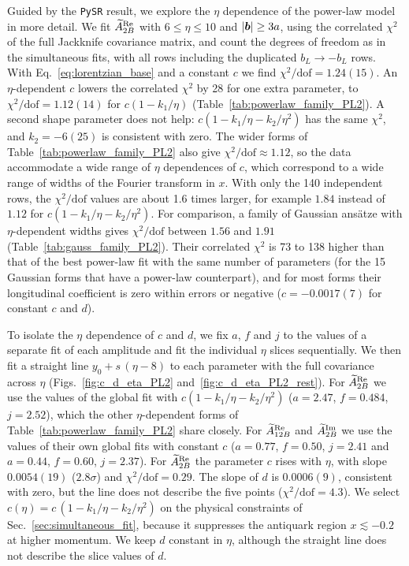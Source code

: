 Guided by the \texttt{PySR} result, we explore the $\eta$ dependence of the power-law model in more detail. We fit $\widetilde{A}_{2B}^{\text{Re}}$ with $6\le\eta\le10$ and $|\boldsymbol{b}|\ge3a$, using the correlated $\chi^2$ of the full Jackknife covariance matrix, and count the degrees of freedom as in the simultaneous fits, with all rows including the duplicated $b_L\to-b_L$ rows. With Eq.~\eqref{eq:lorentzian_base} and a constant $c$ we find $\chi^2/\text{dof}=1.24(15)$. An $\eta$-dependent $c$ lowers the correlated $\chi^2$ by 28 for one extra parameter, to $\chi^2/\text{dof}=1.12(14)$ for $c(1-k_1/\eta)$ (Table~\ref{tab:powerlaw_family_PL2}). A second shape parameter does not help: $c(1-k_1/\eta-k_2/\eta^2)$ has the same $\chi^2$, and $k_2=-6(25)$ is consistent with zero. The wider forms of Table~\ref{tab:powerlaw_family_PL2} also give $\chi^2/\text{dof}\approx1.12$, so the data accommodate a wide range of $\eta$ dependences of $c$, which correspond to a wide range of widths of the Fourier transform in $x$. With only the 140 independent rows, the $\chi^2/\text{dof}$ values are about 1.6 times larger, for example $1.84$ instead of $1.12$ for $c(1-k_1/\eta-k_2/\eta^2)$. For comparison, a family of Gaussian ansätze with $\eta$-dependent widths gives $\chi^2/\text{dof}$ between $1.56$ and $1.91$ (Table~\ref{tab:gauss_family_PL2}). Their correlated $\chi^2$ is 73 to 138 higher than that of the best power-law fit with the same number of parameters (for the 15 Gaussian forms that have a power-law counterpart), and for most forms their longitudinal coefficient is zero within errors or negative ($c=-0.0017(7)$ for constant $c$ and $d$).

To isolate the $\eta$ dependence of $c$ and $d$, we fix $a$, $f$ and $j$ to the values of a separate fit of each amplitude and fit the individual $\eta$ slices sequentially. We then fit a straight line $y_0+s\,(\eta-8)$ to each parameter with the full covariance across $\eta$ (Figs.~\ref{fig:c_d_eta_PL2} and~\ref{fig:c_d_eta_PL2_rest}). For $\widetilde{A}_{2B}^{\text{Re}}$ we use the values of the global fit with $c(1-k_1/\eta-k_2/\eta^2)$ ($a=2.47$, $f=0.484$, $j=2.52$), which the other $\eta$-dependent forms of Table~\ref{tab:powerlaw_family_PL2} share closely. For $\widetilde{A}_{12B}^{\text{Re}}$ and $\widetilde{A}_{2B}^{\text{Im}}$ we use the values of their own global fits with constant $c$ ($a=0.77$, $f=0.50$, $j=2.41$ and $a=0.44$, $f=0.60$, $j=2.37$). For $\widetilde{A}_{2B}^{\text{Re}}$ the parameter $c$ rises with $\eta$, with slope $0.0054(19)$ ($2.8\sigma$) and $\chi^2/\text{dof}=0.29$. The slope of $d$ is $0.0006(9)$, consistent with zero, but the line does not describe the five points ($\chi^2/\text{dof}=4.3$). We select $c(\eta)=c\,(1-k_1/\eta-k_2/\eta^2)$ on the physical constraints of Sec.~\ref{sec:simultaneous_fit}, because it suppresses the antiquark region $x\lesssim-0.2$ at higher momentum. We keep $d$ constant in $\eta$, although the straight line does not describe the slice values of $d$.

